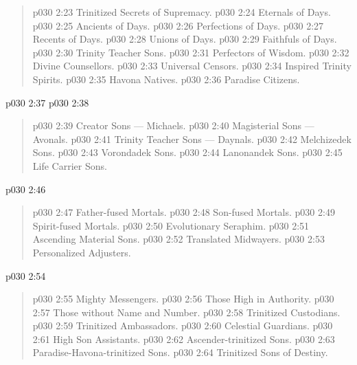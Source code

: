 \begin{quote}
\vs p030 2:23 \bibnobreakspace Trinitized Secrets of Supremacy.
\vs p030 2:24 \bibnobreakspace Eternals of Days.
\vs p030 2:25 \bibnobreakspace Ancients of Days.
\vs p030 2:26 \bibnobreakspace Perfections of Days.
\vs p030 2:27 \bibnobreakspace Recents of Days.
\vs p030 2:28 \bibnobreakspace Unions of Days.
\vs p030 2:29 \bibnobreakspace Faithfuls of Days.
\vs p030 2:30 \bibnobreakspace Trinity Teacher Sons.
\vs p030 2:31 \bibnobreakspace Perfectors of Wisdom.
\vs p030 2:32 \bibnobreakspace Divine Counsellors.
\vs p030 2:33 \bibnobreakspace Universal Censors.
\vs p030 2:34 \bibnobreakspace Inspired Trinity Spirits.
\vs p030 2:35 \bibnobreakspace Havona Natives.
\vs p030 2:36 \bibnobreakspace Paradise Citizens.
\end{quote}
\vsetspace
\vs p030 2:37 \bibnobreakspace {}
\vsetspace
\vs p030 2:38 \bibnobreakspace {}
\begin{quote}
\vs p030 2:39 \bibnobreakspace Creator Sons --- Michaels.
\vs p030 2:40 \bibnobreakspace Magisterial Sons --- Avonals.
\vs p030 2:41 \bibnobreakspace Trinity Teacher Sons --- Daynals.
\vs p030 2:42 \bibnobreakspace Melchizedek Sons.
\vs p030 2:43 \bibnobreakspace Vorondadek Sons.
\vs p030 2:44 \bibnobreakspace Lanonandek Sons.
\vs p030 2:45 \bibnobreakspace Life Carrier Sons.
\end{quote}
\vsetspace
\vs p030 2:46 \bibnobreakspace {}
\begin{quote}
\vs p030 2:47 \bibnobreakspace Father\hyp{}fused Mortals.
\vs p030 2:48 \bibnobreakspace Son\hyp{}fused Mortals.
\vs p030 2:49 \bibnobreakspace Spirit\hyp{}fused Mortals.
\vs p030 2:50 \bibnobreakspace Evolutionary Seraphim.
\vs p030 2:51 \bibnobreakspace Ascending Material Sons.
\vs p030 2:52 \bibnobreakspace Translated Midwayers.
\vs p030 2:53 \bibnobreakspace Personalized Adjusters.
\end{quote}
\vsetspace
\vs p030 2:54 \bibnobreakspace {}
\begin{quote}
\vs p030 2:55 \bibnobreakspace Mighty Messengers.
\vs p030 2:56 \bibnobreakspace Those High in Authority.
\vs p030 2:57 \bibnobreakspace Those without Name and Number.
\vs p030 2:58 \bibnobreakspace Trinitized Custodians.
\vs p030 2:59 \bibnobreakspace Trinitized Ambassadors.
\vs p030 2:60 \bibnobreakspace Celestial Guardians.
\vs p030 2:61 \bibnobreakspace High Son Assistants.
\vs p030 2:62 \bibnobreakspace Ascender\hyp{}trinitized Sons.
\vs p030 2:63 \bibnobreakspace Paradise\hyp{}Havona\hyp{}trinitized Sons.
\vs p030 2:64 \bibnobreakspace Trinitized Sons of Destiny.
\end{quote}
